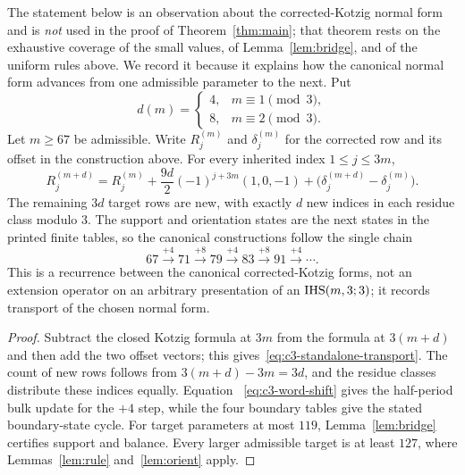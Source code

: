 \begin{remark}\label{rem:mtransport}
The statement below is an observation about the corrected-Kotzig normal form and is
\emph{not} used in the proof of Theorem~\ref{thm:main}; that theorem rests on the exhaustive
coverage of the small values, of Lemma~\ref{lem:bridge}, and of the uniform rules above.
We record it because it explains how the canonical normal form advances from one admissible
parameter to the next.
Put
\[
 d(m)=\begin{cases}4,&m\equiv1\pmod3,\\8,&m\equiv2\pmod3.\end{cases}
\]
Let $m\ge67$ be admissible. Write $R_j^{(m)}$ and $\delta_j^{(m)}$ for the corrected row and its
offset in the construction above.
For every inherited index $1\le j\le3m$,
\begin{equation}\label{eq:c3-standalone-transport}
 R_j^{(m+d)}=R_j^{(m)}+\frac{9d}{2}(-1)^{j+3m}(1,0,-1)
 +\bigl(\delta_j^{(m+d)}-\delta_j^{(m)}\bigr).
\end{equation}
The remaining $3d$ target rows are new, with exactly $d$ new indices in each residue class modulo
$3$. The support and orientation states are the next states in the printed finite tables, so the
canonical constructions follow the single chain
\[
 67\xrightarrow{+4}71\xrightarrow{+8}79\xrightarrow{+4}83
 \xrightarrow{+8}91\xrightarrow{+4}\cdots .
\]
This is a recurrence between the canonical corrected-Kotzig forms, not an extension operator on an
arbitrary presentation of an $\mathrm{IHS}(m,3;3)$; it records transport of the chosen normal form.
\end{remark}
\begin{proof}
Subtract the closed Kotzig formula at $3m$ from the formula at $3(m+d)$ and then add the two offset
vectors; this gives~\eqref{eq:c3-standalone-transport}. The count of new rows follows from
$3(m+d)-3m=3d$, and the residue classes distribute these indices equally. Equation
~\eqref{eq:c3-word-shift} gives the half-period bulk update for the $+4$ step, while the four
boundary tables give the stated boundary-state cycle. For target parameters at most $119$,
Lemma~\ref{lem:bridge} certifies support and balance. Every larger admissible target is at least
$127$, where Lemmas~\ref{lem:rule} and~\ref{lem:orient} apply.
\end{proof}

